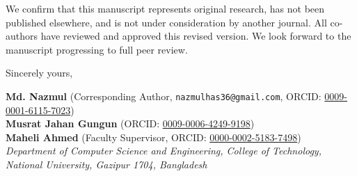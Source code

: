 \documentclass[9.5pt,a4paper]{article}
\begin{document}
\noindent
We confirm that this manuscript represents original research, has not been published elsewhere, and is not under consideration by another journal. All co-authors have reviewed and approved this revised version. We look forward to the manuscript progressing to full peer review.

\vspace{0.08cm}
\noindent
Sincerely yours,

\vspace{0.06cm}
\noindent
\textbf{Md. Nazmul} (Corresponding Author, \texttt{nazmulhas36@gmail.com}, ORCID: \href{https://orcid.org/0009-0001-6115-7023}{0009-0001-6115-7023}) \\
\textbf{Musrat Jahan Gungun} (ORCID: \href{https://orcid.org/0009-0006-4249-9198}{0009-0006-4249-9198}) \\
\textbf{Maheli Ahmed} (Faculty Supervisor, ORCID: \href{https://orcid.org/0000-0002-5183-7498}{0000-0002-5183-7498}) \\
\textit{Department of Computer Science and Engineering, College of Technology, National University, Gazipur 1704, Bangladesh}
\end{document}
